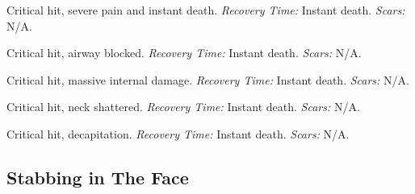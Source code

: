 \begin{description}[labelwidth=1.5em, leftmargin=*, itemsep=0.4em]
    \item[16 -] Critical hit, severe pain and instant death. \textit{Recovery Time:} Instant death. \textit{Scars:} N/A.
    \item[17 -] Critical hit, airway blocked. \textit{Recovery Time:} Instant death. \textit{Scars:} N/A.
    \item[18 -] Critical hit, massive internal damage. \textit{Recovery Time:} Instant death. \textit{Scars:} N/A.
    \item[19 -] Critical hit, neck shattered. \textit{Recovery Time:} Instant death. \textit{Scars:} N/A.
    \item[20 -] Critical hit, decapitation. \textit{Recovery Time:} Instant death. \textit{Scars:} N/A.
\end{description}

\subsection{Stabbing in The Face}

